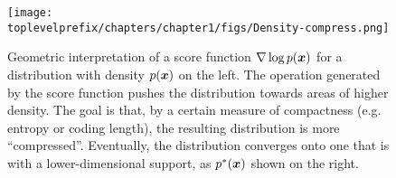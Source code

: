 \documentclass[\toplevelprefix/book-main.tex]{subfiles}
\begin{document}
\begin{figure}
    \centering
    \texttt{[image: \\toplevelprefix/chapters/chapter1/figs/Density-compress.png]}
    \caption{Geometric interpretation of a score function $\nabla \log p(\bm{x})$ for a distribution with density $p(\bm{x})$ on the left. The operation generated by the score function pushes the distribution towards areas of higher density. The goal is that, by a certain measure of compactness (e.g. entropy or coding length), the resulting distribution is more ``compressed''. Eventually, the distribution converges onto one that is with a lower-dimensional support, as $p^*(\bm{x})$ shown on the right.}
    \label{fig:score-function}
\end{figure}
\end{document}
